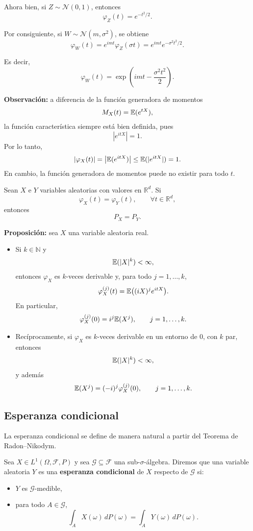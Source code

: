 \noindent
Ahora bien, si $Z\sim \mathcal{N}(0,1)$, entonces
\[
\varphi_Z(t)=e^{-t^2/2}.
\]

Por consiguiente, si $W\sim \mathcal{N}(m,\sigma^2)$, se obtiene
\[
\varphi_W(t)=e^{imt}\varphi_Z(\sigma t)
=
e^{imt}e^{-\sigma^2 t^2/2}.
\]

Es decir,
\[
\varphi_W(t)=\exp\left(imt-\frac{\sigma^2 t^2}{2}\right).
\]

\medskip

\noindent
\textbf{Observación:} a diferencia de la función generadora de momentos
\[
M_X(t)=\mathbb{E}(e^{tX}),
\]
la función característica siempre está bien definida, pues
\[
|e^{itX}|=1.
\]
Por lo tanto,
\[
|\varphi_X(t)|=\left|\mathbb{E}(e^{itX})\right|\leq \mathbb{E}(|e^{itX}|)=1.
\]
En cambio, la función generadora de momentos puede no existir para todo \(t\).

\begin{teo}
Sean \(X\) e \(Y\) variables aleatorias con valores en \(\mathbb{R}^d\). Si
\[
\varphi_X(t)=\varphi_Y(t), \qquad \forall t\in\mathbb{R}^d,
\]
entonces
\[
P_X=P_Y.
\]
\end{teo}

\medskip

\noindent
\textbf{Proposición:} sea \(X\) una variable aleatoria real.

\begin{itemize}
\item[(1)] Si \(k\in\mathbb{N}\) y
\[
\mathbb{E}(|X|^k)<\infty,
\]
entonces \(\varphi_X\) es \(k\)-veces derivable y, para todo \(j=1,\dots,k\),
\[
\varphi_X^{(j)}(t)=\mathbb{E}\big((iX)^j e^{itX}\big).
\]
En particular,
\[
\varphi_X^{(j)}(0)=i^j \mathbb{E}(X^j), \qquad j=1,\dots,k.
\]

\item[(2)] Recíprocamente, si \(\varphi_X\) es \(k\)-veces derivable en un entorno de \(0\), con \(k\) par, entonces
\[
\mathbb{E}(|X|^k)<\infty,
\]
y además
\[
\mathbb{E}(X^j)=(-i)^j\varphi_X^{(j)}(0), \qquad j=1,\dots,k.
\]
\end{itemize}

\subsection{Esperanza condicional}

La esperanza condicional se define de manera natural a partir del Teorema de Radon--Nikodym.

\begin{defi}
Sea \(X\in L^1(\Omega,\mathcal{F},P)\) y sea \(\mathcal{G}\subseteq\mathcal{F}\) una sub-\(\sigma\)-álgebra. Diremos que una variable aleatoria \(Y\) es una \textbf{esperanza condicional} de \(X\) respecto de \(\mathcal{G}\) si:
\begin{itemize}
\item \(Y\) es \(\mathcal{G}\)-medible,
\item para todo \(A\in\mathcal{G}\),
\[
\int_A X(\omega)\,dP(\omega)=\int_A Y(\omega)\,dP(\omega).
\]
\end{itemize}
\end{defi}

